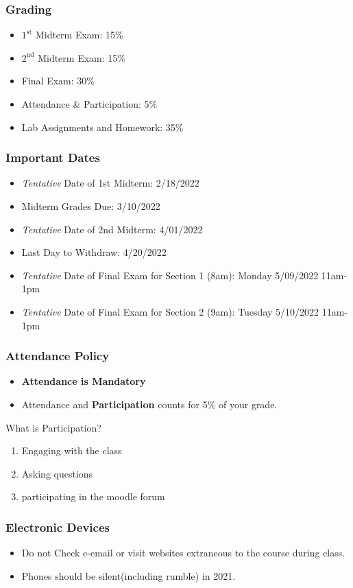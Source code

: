 \documentclass[17pt]{beamer}
\begin{document}
	\begin{frame}
		\frametitle{Grading}
		\begin{itemize}
			\item $1^\text{st}$ Midterm Exam: 15\%
			\item $2^\text{nd}$ Midterm Exam: 15\%
			\item Final Exam: 30\%
			\item Attendance \& Participation: 5\% 
			\item Lab Assignments and Homework: 35\%
		\end{itemize}
	\end{frame}
	\begin{frame}
		\frametitle{Important Dates}
		\begin{itemize}
			\item \textit{Tentative} Date of 1st Midterm: 2/18/2022
			\item Midterm Grades Due: 3/10/2022
			\item \textit{Tentative} Date of 2nd Midterm: 4/01/2022 
			\item Last Day to Withdraw: 4/20/2022
			\item \textit{Tentative} Date of Final Exam for Section 1 (8am): Monday 5/09/2022 11am-1pm
			\item \textit{Tentative} Date of Final Exam for Section 2 (9am): Tuesday 5/10/2022 11am-1pm
		\end{itemize}
	\end{frame}
	\begin{frame}
		\frametitle{Attendance Policy}
		\begin{itemize}
			\item \textbf{Attendance is Mandatory}
			\item Attendance and \textbf{Participation} counts for 5\% of your grade.
		\end{itemize}
		What is Participation?
		\begin{enumerate}
			\item Engaging with the class
			\item Asking questions
			\item participating in the moodle forum
		\end{enumerate}
	\end{frame}
	\begin{frame}
		\frametitle{Electronic Devices}
		\begin{itemize}
			\item Do not Check e-email or visit websites extraneous to the course during class.
			\item Phones should be silent(including rumble) in 2021. 
		\end{itemize}
	\end{frame}
\end{document}
